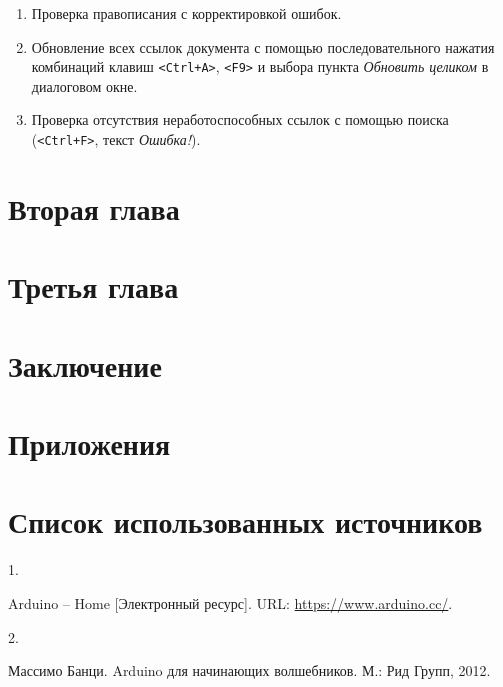 \documentclass[
  a4paper,
]{book}
\providecommand{\tightlist}{%
  \setlength{\itemsep}{0pt}\setlength{\parskip}{0pt}}
\newlength{\cslhangindent}
\newlength{\csllabelwidth}
\newlength{\cslentryspacingunit} %
\newenvironment{CSLReferences}[2] %
 {%
  \setlength{\parindent}{0pt}
  \ifodd #1
  \let\oldpar\par
  \def\par{\hangindent=\cslhangindent\oldpar}
  \fi
  \setlength{\parskip}{#2\cslentryspacingunit}
 }%
 {}
\newcommand{\CSLLeftMargin}[1]{\parbox[t]{\csllabelwidth}{#1}}
\newcommand{\CSLRightInline}[1]{\parbox[t]{\linewidth - \csllabelwidth}{#1}\break}
\theoremstyle{definition}
\theoremstyle{definition}
\theoremstyle{definition}
\theoremstyle{definition}
\theoremstyle{remark}
\begin{document}
\begin{itemize}
  \begin{enumerate}
  \def\labelenumi{\arabic{enumi}.}
  \tightlist
  \item
    Проверка правописания с корректировкой ошибок.
  \item
    Обновление всех ссылок документа с помощью последовательного нажатия комбинаций клавиш \texttt{\textless{}Ctrl+A\textgreater{}}, \texttt{\textless{}F9\textgreater{}} и выбора пункта \emph{Обновить целиком} в диалоговом окне.
  \item
    Проверка отсутствия неработоспособных ссылок с помощью поиска (\texttt{\textless{}Ctrl+F\textgreater{}}, текст \emph{Ошибка!}).
  \end{enumerate}
\end{itemize}

\hypertarget{chapter2}{%
\chapter{Вторая глава}\label{chapter2}}

\hypertarget{chapter3}{%
\chapter{Третья глава}\label{chapter3}}

\hypertarget{conclusion}{%
\chapter*{Заключение}\label{conclusion}}

\hypertarget{appendix}{%
\chapter*{Приложения}\label{appendix}}

\hypertarget{references}{%
\chapter*{Список использованных источников}\label{references}}

\hypertarget{refs}{}
\begin{CSLReferences}{0}{0}
\leavevmode{}%
\CSLLeftMargin{1. }%
\CSLRightInline{Arduino -- Home {[}Электронный ресурс{]}. URL: \url{https://www.arduino.cc/}.}

\leavevmode{}%
\CSLLeftMargin{2. }%
\CSLRightInline{Массимо Банци. Arduino для начинающих волшебников. М.: Рид Групп, 2012.}

\end{CSLReferences}
\end{document}
